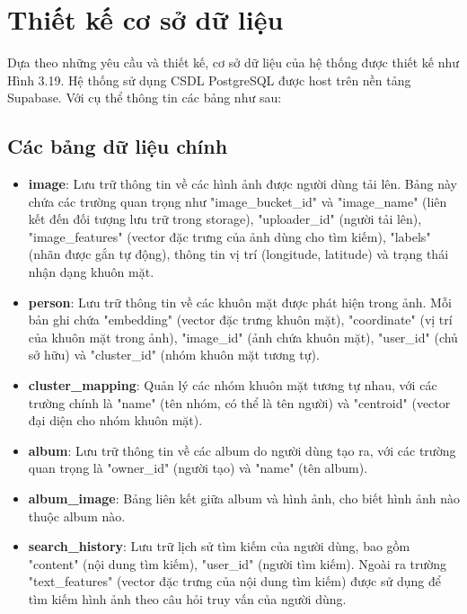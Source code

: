 \section{Thiết kế cơ sở dữ liệu}


Dựa theo những yêu cầu và thiết kế, cơ sở dữ liệu của hệ thống được thiết kế
như Hình 3.19. Hệ thống sử dụng CSDL PostgreSQL được host trên nền tảng Supabase. Với cụ thể thông tin các bảng như sau: 
\subsection{Các bảng dữ liệu chính}
\begin{itemize}
    \item \textbf{image}: Lưu trữ thông tin về các hình ảnh được người dùng tải lên. Bảng này chứa các trường quan trọng như "image\_bucket\_id" và "image\_name" (liên kết đến đối tượng lưu trữ trong storage), "uploader\_id" (người tải lên), "image\_features" (vector đặc trưng của ảnh dùng cho tìm kiếm), "labels" (nhãn được gắn tự động), thông tin vị trí (longitude, latitude) và trạng thái nhận dạng khuôn mặt.
    
    \item \textbf{person}: Lưu trữ thông tin về các khuôn mặt được phát hiện trong ảnh. Mỗi bản ghi chứa "embedding" (vector đặc trưng khuôn mặt), "coordinate" (vị trí của khuôn mặt trong ảnh), "image\_id" (ảnh chứa khuôn mặt), "user\_id" (chủ sở hữu) và "cluster\_id" (nhóm khuôn mặt tương tự).
    
    \item \textbf{cluster\_mapping}: Quản lý các nhóm khuôn mặt tương tự nhau, với các trường chính là "name" (tên nhóm, có thể là tên người) và "centroid" (vector đại diện cho nhóm khuôn mặt).
    
    \item \textbf{album}: Lưu trữ thông tin về các album do người dùng tạo ra, với các trường quan trọng là "owner\_id" (người tạo) và "name" (tên album).
    
    \item \textbf{album\_image}: Bảng liên kết giữa album và hình ảnh, cho biết hình ảnh nào thuộc album nào.
    
    \item \textbf{search\_history}: Lưu trữ lịch sử tìm kiếm của người dùng, bao gồm "content" (nội dung tìm kiếm), "user\_id" (người tìm kiếm). Ngoài ra trường "text\_features" (vector đặc trưng của nội dung tìm kiếm) được sử dụng để tìm kiếm hình ảnh theo câu hỏi truy vấn của người dùng. 
    

\end{itemize}
